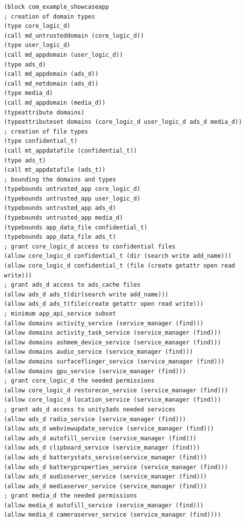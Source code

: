 \begin{lstlisting}[language=policyfile, caption=\bf showcase app sepolicy.cil,
captionpos=b, numbersep=2pt, resetmargins=false, label=seapp_sepolctxp]
(block com_example_showcaseapp
; creation of domain types
(type core_logic_d)
(call md_untrusteddomain (core_logic_d))
(type user_logic_d)
(call md_appdomain (user_logic_d))
(type ads_d)
(call md_appdomain (ads_d))
(call md_netdomain (ads_d))
(type media_d)
(call md_appdomain (media_d))
(typeattribute domains)
(typeattributeset domains (core_logic_d user_logic_d ads_d media_d))
; creation of file types
(type confidential_t)
(call mt_appdatafile (confidential_t))
(type ads_t)
(call mt_appdatafile (ads_t))
; bounding the domains and types
(typebounds untrusted_app core_logic_d)
(typebounds untrusted_app user_logic_d)
(typebounds untrusted_app ads_d)
(typebounds untrusted_app media_d)	
(typebounds app_data_file confidential_t)
(typebounds app_data_file ads_t)
; grant core_logic_d access to confidential files
(allow core_logic_d confidential_t (dir (search write add_name)))
(allow core_logic_d confidential_t (file (create getattr open read write)))
; grant ads_d access to ads_cache files
(allow ads_d ads_t(dir(search write add_name)))
(allow ads_d ads_t(file(create getattr open read write)))
; minimum app_api_service subset
(allow domains activity_service (service_manager (find)))
(allow domains activity_task_service (service_manager (find)))
(allow domains ashmem_device_service (service_manager (find)))
(allow domains audio_service (service_manager (find)))
(allow domains surfaceflinger_service (service_manager (find)))
(allow domains gpu_service (service_manager (find)))
; grant core_logic_d the needed permissions
(allow core_logic_d restorecon_service (service_manager (find)))
(allow core_logic_d location_service (service_manager (find)))
; grant ads_d access to unity3ads needed services
(allow ads_d radio_service (service_manager (find)))
(allow ads_d webviewupdate_service (service_manager (find)))
(allow ads_d autofill_service (service_manager (find)))
(allow ads_d clipboard_service (service_manager (find)))
(allow ads_d batterystats_service(service_manager (find)))
(allow ads_d batteryproperties_service (service_manager (find)))
(allow ads_d audioserver_service (service_manager (find)))
(allow ads_d mediaserver_service (service_manager (find)))
; grant media_d the needed permissions
(allow media_d autofill_service (service_manager (find)))
(allow media_d cameraserver_service (service_manager (find))))
\end{lstlisting}


